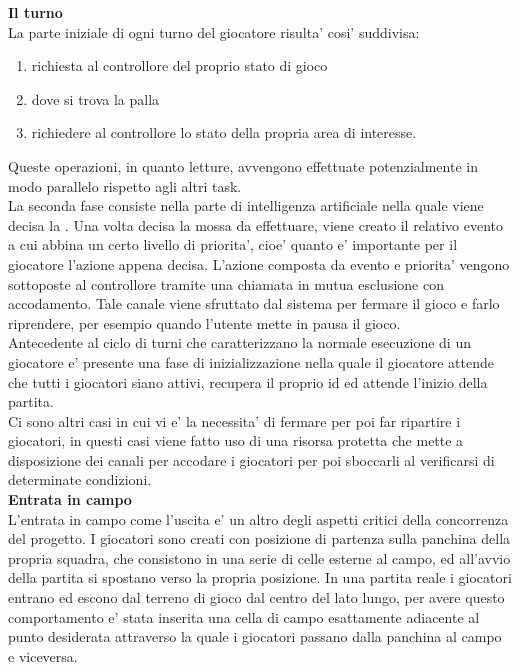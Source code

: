 \textbf{Il turno}\\

La parte iniziale di ogni turno del giocatore risulta' cosi' suddivisa:

\begin{enumerate}
	\item richiesta al controllore del proprio stato di gioco
	\item dove si trova la palla
	\item richiedere al controllore lo stato della propria area di interesse.
\end{enumerate}

Queste operazioni, in quanto letture, avvengono effettuate potenzialmente in modo parallelo rispetto agli altri task.\\

La seconda fase consiste nella parte di intelligenza artificiale nella quale viene decisa la . Una volta decisa la mossa da effettuare, viene creato il relativo evento a cui abbina un certo livello di priorita', cioe' quanto e' importante per il giocatore l'azione appena decisa. L'azione composta da evento e priorita' vengono sottoposte al controllore tramite una chiamata in mutua esclusione con accodamento. Tale canale viene sfruttato dal sistema per fermare il gioco e farlo riprendere, per esempio quando l'utente mette in pausa il gioco.\\

Antecedente al ciclo di turni che caratterizzano la normale esecuzione di un giocatore e' presente una fase di inizializzazione nella quale il giocatore attende che tutti i giocatori siano attivi, recupera il proprio id ed attende l'inizio della partita.\\

Ci sono altri casi in cui vi e' la necessita' di fermare per poi far ripartire i giocatori, in questi casi viene fatto uso di una risorsa protetta che mette a disposizione dei canali per accodare i giocatori per poi sboccarli al verificarsi di determinate condizioni.\\

\textbf{Entrata in campo}\\

L'entrata in campo come l'uscita e' un altro degli aspetti critici della concorrenza del progetto. I giocatori sono creati con posizione di partenza sulla panchina della propria squadra, che consistono in una serie di celle esterne al campo, ed all'avvio della partita si spostano verso la propria posizione. In una partita reale i giocatori entrano ed escono dal terreno di gioco dal centro del lato lungo, per avere questo comportamento e' stata inserita una cella di campo esattamente adiacente al punto desiderata attraverso la quale i giocatori passano dalla panchina al campo e viceversa.\\

